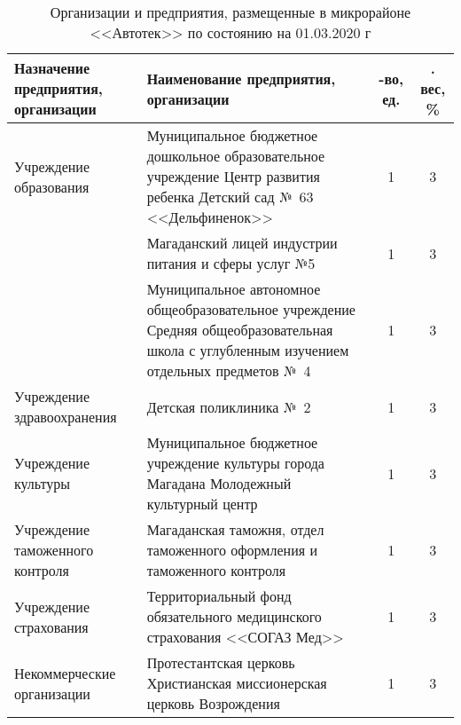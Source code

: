 \begin{table}[h!]
\caption{Организации и предприятия, размещенные в микрорайоне <<Автотек>> по состоянию на 01.03.2020 г}
\label{tab:kodirev-tab-1}
\begin{changemargin}{-2cm}{-1cm}
\begin{tabular}{p{5cm}p{7cm}cc}
   \toprule
Назначение предприятия, организации &
Наименование предприятия, организации &
 \parbox[c][][c]{0.1\textwidth}{ -во, ед.} &
  \parbox[c][][c]{0.1\textwidth}{ . вес, \%} \\
   \toprule
Учреждение 				образования              & Муниципальное 				бюджетное дошкольное образовательное 				учреждение Центр развития ребенка 				Детский сад №~63 <<Дельфиненок>>                            & 1               & 3               \\
                                        & Магаданский 				лицей индустрии питания и сферы услуг 				№5                                                                                              & 1               & 3               \\
                                        & Муниципальное 				автономное общеобразовательное 				учреждение Средняя общеобразовательная 				школа с углубленным изучением отдельных 				предметов №~4 & 1               & 3               \\ \midrule
Учреждение 				здравоохранения          & Детская 				поликлиника №~2                                                                                                                               & 1               & 3               \\ \midrule
Учреждение 				культуры                 & Муниципальное 				бюджетное учреждение культуры города 				Магадана Молодежный культурный центр                                                           & 1               & 3               \\ \midrule
Учреждение 				таможенного контроля     & Магаданская 				таможня, отдел таможенного оформления 				и таможенного контроля                                                                          & 1               & 3               \\ \midrule
Учреждение 				страхования              & Территориальный 				фонд обязательного медицинского 				страхования <<СОГАЗ Мед>>                                                                           & 1               & 3               \\ \midrule
Некоммерческие 				организации          & Протестантская 				церковь Христианская миссионерская 				церковь Возрождения                                                                             & 1               & 3               \\

\end{tabular}
\end{changemargin}
\end{table}
